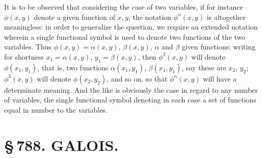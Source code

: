 \documentclass[11pt,a4paper]{book}
\begin{document}
It is to be observed that considering the case of two variables, if for instance $\phi(x, y)$ denote a given function of $x, y$, the notation $\phi^{n}(x, y)$ is altogether meaningless: in order to generalize the question, we require an extended notation wherein a single functional symbol is used to denote two functions of the two variables. Thus $\phi(x, y) = \alpha(x, y)$, $\beta(x, y)$, $\alpha$ and $\beta$ given functions; writing for shortness $x_{1} = \alpha(x, y)$, $y_{1} = \beta(x, y)$, then $\phi^{2}(x, y)$ will denote $\phi(x_{1}, y_{1})$, that is, two functions $\alpha(x_{1}, y_{1})$, $\beta(x_{1}, y_{1})$, say these are $x_{2}$, $y_{2}$; $\phi^{3}(x, y)$ will denote $\phi(x_{2}, y_{2})$, and so on, so that $\phi^{n}(x, y)$ will have a determinate meaning. And the like is obviously the case in regard to any number of variables, the single functional symbol denoting in each case a set of functions equal in number to the variables.

\newpage
\section*{\S\,788. GALOIS.}


\smallskip
\end{document}
